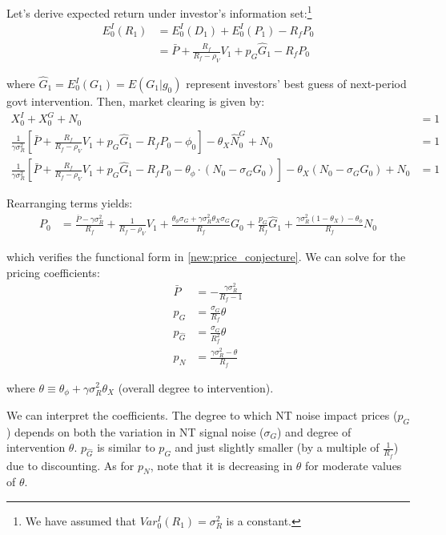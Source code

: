 \documentclass[12pt]{article}
\begin{document}
Let's derive expected return under investor's information set:\footnote{We have assumed that $Var_0^I(R_1) = \sigma_R^2$ is a constant.}
\begin{align*}
    E_0^I(R_1) & = E_0^I(D_1) + E_0^I(P_1) - R_f P_0 \\
    & = \bar{P} + \frac{R_f}{R_f - \rho_V} V_1 + p_G \hat{G}_1 - R_f P_0
\end{align*}

\noindent where $\hat{G}_1 = E_0^I(G_1) = E(G_1 | g_0)$ represent investors' best guess of next-period govt intervention. Then, market clearing is given by:
\begin{align*}
    X_0^I + X_0^G + N_0 & = 1 \\
    \frac{1}{\gamma \sigma_R^2} \left[\bar{P} + \frac{R_f}{R_f - \rho_V} V_1 + p_G \hat{G}_1 - R_f P_0 - \phi_0 \right] - \theta_X \hat{N}^G_0 + N_0 & = 1 \\
    \frac{1}{\gamma \sigma_R^2} \left[\bar{P} + \frac{R_f}{R_f - \rho_V} V_1 + p_G \hat{G}_1 - R_f P_0 - \theta_\phi \cdot (N_0 - \sigma_G G_0) \right] - \theta_X (N_0 - \sigma_G G_0) + N_0 & = 1
\end{align*}

Rearranging terms yields:
\begin{align*}
    P_0 & = \frac{\bar{P} - \gamma \sigma_R^2}{R_f} + \frac{1}{R_f - \rho_V} V_1 + \frac{\theta_\phi \sigma_G + \gamma \sigma_R^2 \theta_X \sigma_G}{R_f} G_0 + \frac{p_G}{R_f} \hat{G}_1 + \frac{\gamma \sigma_R^2 (1-\theta_X) - \theta_\phi}{R_f} N_0
\end{align*}

\noindent which verifies the functional form in \eqref{new:price_conjecture}. We can solve for the pricing coefficients:
\begin{align*}
    \bar{P} & = - \frac{\gamma \sigma_R^2}{R_f - 1} \\
    p_G & = \frac{\sigma_G}{R_f} \theta \\
    p_{\hat{G}} & = \frac{\sigma_G}{R_f^2} \theta \\
    p_N & = \frac{\gamma \sigma_R^2 - \theta}{R_f}
\end{align*}

\noindent where $\theta \equiv \theta_\phi + \gamma \sigma_R^2 \theta_X$ (overall degree to intervention). 

We can interpret the coefficients. The degree to which NT noise impact prices ($p_G$) depends on both the variation in NT signal noise ($\sigma_G$) and degree of intervention $\theta$. $p_{\hat{G}}$ is similar to $p_G$ and just slightly smaller (by a multiple of $\frac{1}{R_f}$) due to discounting. As for $p_N$, note that it is decreasing in $\theta$ for moderate values of $\theta$. 
\end{document}
